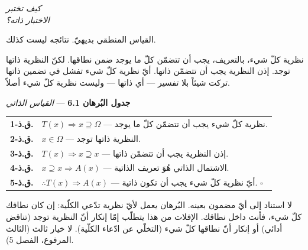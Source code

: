 \documentclass[10pt, openany, oneside]{book}
\renewcommand{\footnotesize}{\fontsize{8.5}{11}\selectfont}
\begin{document}
\vspace{1.5em}

\begin{center}
    \itshape
    كيف تختبر\\
    الاختبار ذاته؟
\end{center}

\vspace{2em}


\noindent القياس المنطقي بديهيّ. نتائجه ليست كذلك.

نظرية كلّ شيء، بالتعريف، يجب أن تتضمّن كلّ ما يوجد ضمن نطاقها. لكنّ النظرية ذاتها توجد. إذن النظرية يجب أن تتضمّن ذاتها. أيّ نظرية كلّ شيء تفشل في تضمين ذاتها تركت شيئاً بلا تفسير --- أي ذاتها --- وليست نظرية كلّ شيء أصلاً.

\vspace{0.5em}

\textbf{جدول البُرهان 6.1} --- \textit{القياس الذاتي}

\vspace{0.5em}

{\footnotesize
\noindent\begin{tabular}{r p{}}
\textbf{ق.ذ-1.} & $T(x) \Rightarrow x \supseteq \Omega$ --- نظرية كلّ شيء يجب أن تتضمّن كلّ ما يوجد. \\[0.3em]
\textbf{ق.ذ-2.} & $x \in \Omega$ --- النظرية ذاتها توجد. \\[0.3em]
\textbf{ق.ذ-3.} & $T(x) \Rightarrow x \supseteq x$ --- إذن النظرية يجب أن تتضمّن ذاتها. \\[0.3em]
\textbf{ق.ذ-4.} & $x \supseteq x \Rightarrow A(x)$ --- الاشتمال الذاتي هُوَ تعريف الذاتية. \\[0.3em]
\textbf{ق.ذ-5.} & $\therefore T(x) \Rightarrow A(x)$ --- أيّ نظرية كلّ شيء يجب أن تكون ذاتية. $\square$ \\[0.3em]
\end{tabular}
}

\vspace{0.8em}

\noindent لا استناد إلى أيّ مضمون بعينه. البُرهان يعمل لأيّ نظرية تدّعي الكلّية: إن كان نطاقك كلّ شيء، فأنت داخل نطاقك. الإفلات من هذا يتطلّب إمّا إنكار أنّ النظرية توجد (تناقض أدائي) أو إنكار أنّ نطاقها كلّ شيء (التخلّي عن ادّعاء الكلّية). لا خيار ثالث (الثالث المرفوع، الفصل 5).

\vspace{1.5em}
\end{document}
